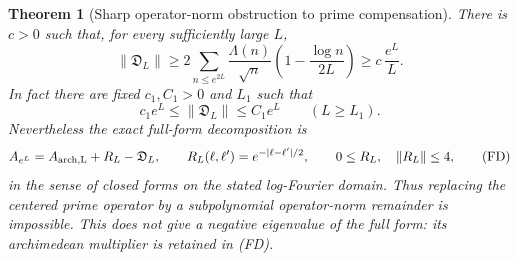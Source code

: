 \documentclass[11pt]{article}
\newtheorem{theorem}{Theorem}
\theoremstyle{remark}\newtheorem{remark}[theorem]{Remark}
\begin{document}
\begin{theorem}[Sharp operator-norm obstruction to prime compensation]
\label{thm:prime-norm}
There is $c>0$ such that, for every sufficiently large $L$,
\[
 \|\mathfrak D_L\|\ge
 2\sum_{n\le e^{2L}}\frac{\Lambda(n)}{\sqrt n}
           \left(1-\frac{\log n}{2L}\right)
 \ge c\,\frac{e^L}{L}.
 \tag{ON}
\]
In fact there are fixed $c_1,C_1>0$ and $L_1$ such that
\[
 c_1e^L\le\|\mathfrak D_L\|\le C_1e^L
 \qquad(L\ge L_1).                                      \tag{SN}
\]
Nevertheless the exact full-form decomposition is
\[
 A_{e^L}=A_{\rm arch,L}+R_L-\mathfrak D_L,
 \qquad R_L(\ell,\ell')=e^{-|\ell-\ell'|/2},
 \qquad 0\le R_L,\quad \|R_L\|\le4 ,
 \tag{FD}
\]
in the sense of closed forms on the stated log-Fourier domain.
Thus replacing the centered prime operator by a subpolynomial
operator-norm remainder is impossible. This does not give a
negative eigenvalue of the full form: its archimedean multiplier
is retained in (FD).
\end{theorem}
\end{document}
